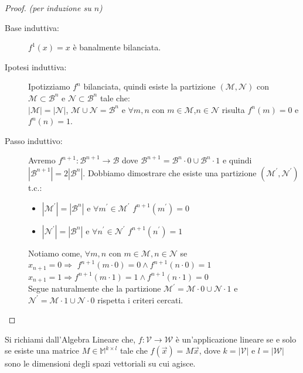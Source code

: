 \documentclass[12pt,a4paper,openright]{report}
\begin{document}
\begin{proof}
    \textit{(per induzione su $n$)\\}
    \begin{description}
        \item[Base induttiva:] $f^1(x)=x$ è banalmente bilanciata.
        \item[Ipotesi induttiva:] Ipotizziamo $f^n$ bilanciata, quindi esiste la partizione $(\mathcal{M},\mathcal{N})$ con $\mathcal{M}\subset\mathcal{B}^n$ e $\mathcal{N}\subset\mathcal{B}^n$ tale che:\\
                                      ${\left\vert{\mathcal{M}}\right\vert} = {\left\vert{\mathcal{N}}\right\vert}$, $\mathcal{M} \cup \mathcal{N} = \mathcal{B}^n$ e $\forall m,n$ con
                                      $m\in\mathcal{M}$,$n \in\mathcal{N}$ risulta $f^n(m) = 0$ e $ f^n(n) = 1$.
        \item[Passo induttivo:] Avremo $f^{n+1}:\mathcal{B}^{n+1}\rightarrow\mathcal{B}$ dove  $\mathcal{B}^{n+1} = \mathcal{B}^n\cdot0 \cup \mathcal{B}^n\cdot1$ e quindi\\
                                     $\left\vert\mathcal{B}^{n+1}\right\vert = 2\left\vert\mathcal{B}^{n}\right\vert$. Dobbiamo dimostrare che esiste una partizione
                                     $(\mathcal{M^\prime},\mathcal{N^\prime})$ t.c.:
                                     \begin{itemize}
                                        \item $\left\vert\mathcal{M^\prime}\right\vert=\left\vert\mathcal{B}^{n}\right\vert$ e $\forall m^\prime \in \mathcal{M^\prime}$ $f^{n+1}(m^\prime) = 0$ 
                                        \item $\left\vert\mathcal{N^\prime}\right\vert=\left\vert\mathcal{B}^{n}\right\vert$ e $\forall n^\prime \in \mathcal{N^\prime}$ $f^{n+1}(n^\prime) = 1$   
                                      \end{itemize}
                                      Notiamo come, $\forall m,n$ con $ m\in\mathcal{M},n\in\mathcal{N}$ se\\
                                      $x_{n+1} = 0 \Rightarrow $ $f^{n+1}(m\cdot0)=0 \land f^{n+1}(n\cdot0)=1$\\
                                      $x_{n+1} = 1 \Rightarrow $$f^{n+1}(m\cdot1)=1 \land f^{n+1}(n\cdot1)=0$\\
                                      Segue naturalmente che la partizione $\mathcal{M^\prime} = \mathcal{M}\cdot0 \cup \mathcal{N}\cdot1$ e $\mathcal{N^\prime} = \mathcal{M}\cdot1 \cup \mathcal{N}\cdot0$
                                      rispetta i criteri cercati. 
    \end{description}      
\end{proof}
\par
Si richiami dall'Algebra Lineare che, $f:\mathcal{V}\rightarrow\mathcal{W}$ è un'applicazione lineare se e solo se esiste una matrice $M \in \mathbb{M}^{k \times l}$ tale che $f(\vec{x})=M\vec{x}$, dove $k = \left\vert\mathcal{V}\right\vert$ e $l = \left\vert\mathcal{W}\right\vert$ sono le dimensioni degli spazi vettoriali su cui agisce.
\end{document}
